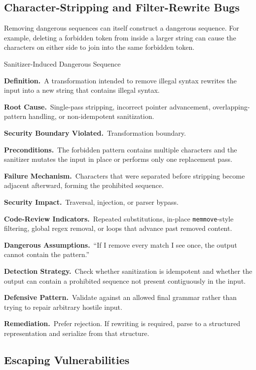 \documentclass[11pt]{article}
\newcommand{\field}[1]{\par\smallskip\noindent\textbf{#1.}\ }
\begin{document}
\subsection{Character-Stripping and Filter-Rewrite Bugs}

Removing dangerous sequences can itself construct a dangerous sequence. For example, deleting a forbidden token from inside a larger string can cause the characters on either side to join into the same forbidden token.

\begin{catalogbox}{Sanitizer-Induced Dangerous Sequence}
\field{Definition}A transformation intended to remove illegal syntax rewrites the input into a new string that contains illegal syntax.

\field{Root Cause}Single-pass stripping, incorrect pointer advancement, overlapping-pattern handling, or non-idempotent sanitization.

\field{Security Boundary Violated}Transformation boundary.

\field{Preconditions}The forbidden pattern contains multiple characters and the sanitizer mutates the input in place or performs only one replacement pass.

\field{Failure Mechanism}Characters that were separated before stripping become adjacent afterward, forming the prohibited sequence.

\field{Security Impact}Traversal, injection, or parser bypass.

\field{Code-Review Indicators}Repeated substitutions, in-place \texttt{memmove}-style filtering, global regex removal, or loops that advance past removed content.

\field{Dangerous Assumptions}``If I remove every match I see once, the output cannot contain the pattern.''

\field{Detection Strategy}Check whether sanitization is idempotent and whether the output can contain a prohibited sequence not present contiguously in the input.

\field{Defensive Pattern}Validate against an allowed final grammar rather than trying to repair arbitrary hostile input.

\field{Remediation}Prefer rejection. If rewriting is required, parse to a structured representation and serialize from that structure.
\end{catalogbox}
\clearpage

\subsection{Escaping Vulnerabilities}
\end{document}
